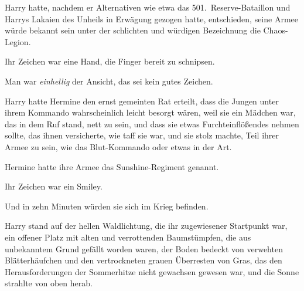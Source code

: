 Harry hatte, nachdem er Alternativen wie etwa das 501.~Reserve-Bataillon und Harrys Lakaien des Unheils in Erwägung gezogen hatte, entschieden, seine Armee würde bekannt sein unter der schlichten und würdigen Bezeichnung die Chaos-Legion.%

Ihr Zeichen war eine Hand, die Finger bereit zu schnipsen.

Man war \emph{einhellig} der Ansicht, das sei kein gutes Zeichen.

Harry hatte Hermine den ernst gemeinten Rat erteilt, dass die Jungen unter ihrem Kommando wahrscheinlich leicht besorgt wären, weil sie ein Mädchen war, das in dem Ruf stand, nett zu sein, und dass sie etwas Furchteinflößendes nehmen sollte, das ihnen versicherte, wie taff sie war, und sie stolz machte, Teil ihrer Armee zu sein, wie das Blut-Kommando oder etwas in der Art.

Hermine hatte ihre Armee das Sunshine-Regiment genannt.

Ihr Zeichen war ein Smiley.

Und in zehn Minuten würden sie sich im Krieg befinden.

Harry stand auf der hellen Waldlichtung, die ihr zugewiesener Startpunkt war, ein offener Platz mit alten und verrottenden Baumstümpfen, die aus unbekanntem Grund gefällt worden waren, der Boden bedeckt von verwehten Blätterhäufchen und den vertrockneten grauen Überresten von Gras, das den Herausforderungen der Sommerhitze nicht gewachsen gewesen war, und die Sonne strahlte von oben herab.


